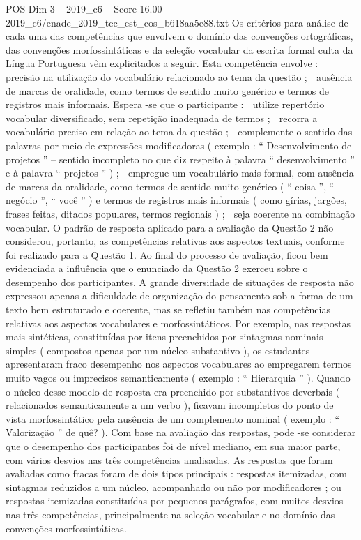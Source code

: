 \begin{textsample}{POS Dim 3 – 2019\_c6 – Score 16.00 – 2019\_c6/enade\_2019\_tec\_est\_cos\_b618aa5e88.txt}
Os critérios para análise de cada uma das competências que envolvem o domínio das convenções ortográficas, das convenções morfossintáticas e da seleção vocabular da escrita formal culta da Língua Portuguesa vêm explicitados a seguir.
Esta competência envolve :  precisão na utilização do vocabulário relacionado ao tema da questão ;  ausência de marcas de oralidade, como termos de sentido muito genérico e termos de registros mais informais.
Espera -se que o participante :  utilize repertório vocabular diversificado, sem repetição inadequada de termos ;  recorra a vocabulário preciso em relação ao tema da questão ;  complemente o sentido das palavras por meio de expressões modificadoras ( exemplo : “ Desenvolvimento de projetos ” – sentido incompleto no que diz respeito à palavra “ desenvolvimento ” e à palavra “ projetos ” ) ;  empregue um vocabulário mais formal, com ausência de marcas da oralidade, como termos de sentido muito genérico ( “ coisa ”, “ negócio ”, “ você ” ) e termos de registros mais informais ( como gírias, jargões, frases feitas, ditados populares, termos regionais ) ;  seja coerente na combinação vocabular.
O padrão de resposta aplicado para a avaliação da Questão 2 não considerou, portanto, as competências relativas aos aspectos textuais, conforme foi realizado para a Questão 1.
Ao final do processo de avaliação, ficou bem evidenciada a influência que o enunciado da Questão 2 exerceu sobre o desempenho dos participantes.
A grande diversidade de situações de resposta não expressou apenas a dificuldade de organização do pensamento sob a forma de um texto bem estruturado e coerente, mas se refletiu também nas competências relativas aos aspectos vocabulares e morfossintáticos.
Por exemplo, nas respostas mais sintéticas, constituídas por itens preenchidos por sintagmas nominais simples ( compostos apenas por um núcleo substantivo ), os estudantes apresentaram fraco desempenho nos aspectos vocabulares ao empregarem termos muito vagos ou imprecisos semanticamente ( exemplo : “ Hierarquia ” ).
Quando o núcleo desse modelo de resposta era preenchido por substantivos deverbais ( relacionados semanticamente a um verbo ), ficavam incompletos do ponto de vista morfossintático pela ausência de um complemento nominal ( exemplo : “ Valorização ” de quê? ).
Com base na avaliação das respostas, pode -se considerar que o desempenho dos participantes foi de nível mediano, em sua maior parte, com vários desvios nas três competências analisadas.
As respostas que foram avaliadas como fracas foram de dois tipos principais : respostas itemizadas, com sintagmas reduzidos a um núcleo, acompanhado ou não por modificadores ; ou respostas itemizadas constituídas por pequenos parágrafos, com muitos desvios nas três competências, principalmente na seleção vocabular e no domínio das convenções morfossintáticas.

\end{textsample}
